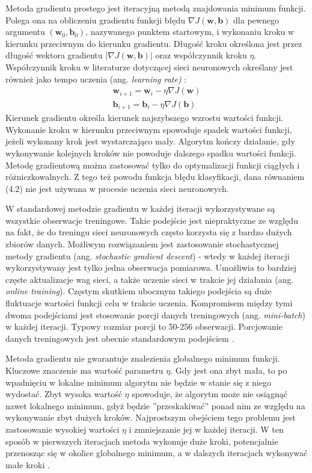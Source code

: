 \documentclass[notitlepage]{report}
\begin{document}
Metoda gradientu prostego jest iteracyjną metodą znajdowania minimum funkcji. Polega ona na obliczeniu gradientu funkcji błędu $\nabla J(\mathbf{w},\mathbf{b})$ dla pewnego argumentu $(\mathbf{w}_0,\mathbf{b}_0)$, nazywanego punktem startowym, i wykonaniu kroku w kierunku przeciwnym do kierunku gradientu. Długość kroku określona jest przez długość wektora gradientu $|\nabla J(\mathbf{w},\mathbf{b})|$ oraz współczynnik kroku $\eta$. Współczynnik kroku w literaturze dotyczącej sieci neuronowych określany jest również jako tempo uczenia (ang. \textit{learning rate)} \cite{ruder}:
\begin{equation}
\begin{split}
\mathbf{w}_{i+1} = \mathbf{w}_i - \eta\nabla J(\mathbf{w}) \\
\mathbf{b}_{i+1} = \mathbf{b}_i - \eta\nabla J(\mathbf{b})
\end{split}
\end{equation}
Kierunek gradientu określa kierunek najszybszego wzrostu wartości funkcji. Wykonanie kroku w kierunku przeciwnym spowoduje spadek wartości funkcji, jeżeli wykonany krok jest wystarczająco mały. Algorytm kończy działanie, gdy wykonywanie kolejnych kroków nie powoduje dalszego spadku wartości funkcji. Metodę gradientową można zastosować tylko do optymalizacji funkcji ciągłych i różniczkowalnych. Z tego też powodu funkcja błędu klasyfikacji, dana równaniem (4.2) nie jest używana w procesie uczenia sieci neuronowych.

W standardowej metodzie gradientu w każdej iteracji wykorzystywane są wszystkie obserwacje treningowe. Takie podejście jest niepraktyczne ze względu na fakt, że do treningu sieci neuronowych często korzysta się z bardzo dużych zbiorów danych. Możliwym rozwiązaniem jest zastosowanie stochastycznej metody gradientu (ang. \textit{stochastic gradient descent}) - wtedy w każdej iteracji wykorzystywany jest tylko jedna obserwacja pomiarowa. Umożliwia to bardziej częste aktualizacje wag sieci, a także uczenie sieci w trakcie jej działania (ang. \textit{online training}). Częstym skutkiem ubocznym takiego podejścia są duże fluktuacje wartości funkcji celu w trakcie uczenia. Kompromisem między tymi dwoma podejściami jest stosowanie porcji danych treningowych (ang. \textit{mini-batch}) w każdej iteracji. Typowy rozmiar porcji to 50-256 obserwacji. Porcjowanie danych treningowych jest obecnie standardowym podejściem \cite{goodfellow} \cite{ruder}. 

Metoda gradientu nie gwarantuje znalezienia globalnego minimum funkcji. 
Kluczowe znaczenie ma wartość parametru $\eta$. Gdy jest ona zbyt mała, to po wpadnięciu w lokalne minimum algorytm nie będzie w stanie się z niego wydostać. Zbyt wysoka wartość $\eta$ spowoduje, że algorytm może nie osiągnąć nawet lokalnego minimum, gdyż będzie ''przeskakiwać'' ponad nim ze względu na wykonywanie zbyt dużych kroków. Najprostszym obejściem tego problemu jest zastosowanie wysokiej wartości $\eta$ i zmniejszanie jej w każdej iteracji. W ten sposób w pierwszych iteracjach metoda wykonuje duże kroki, potencjalnie przenosząc się w okolice globalnego minimum, a w dalszych iteracjach wykonywać małe kroki \cite{ruder}. 
\end{document}
